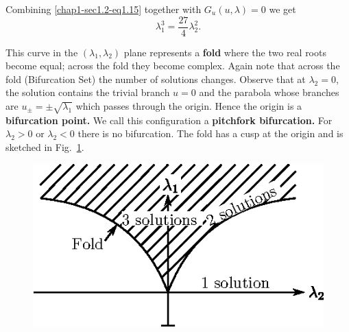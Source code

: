 Combining \eqref{chap1-sec1.2-eq1.15} together with $G_{u}(u, \lambda)
= 0$ we get 
\begin{equation*}
\lambda^{3}_{1} = \frac{27}{4}
\lambda^{2}_{2}.\tag{1.17}\label{chap1-sec1.2-eq1.17} 
\end{equation*}

This curve in the $(\lambda_{1}, \lambda_{2})$ plane represents a \textbf{fold}
where the two real roots become equal; across the fold they become
complex. Again note that across the fold (Bifurcation Set) the number
of solutions changes. Observe that at $\lambda_{2} = 0$, the solution
contains the trivial branch $u = 0$ and the parabola whose branches
are $u_{\pm} = \pm\sqrt{\lambda_{1}}$ which passes through the
origin. Hence the origin is a {\bf{bifurcation point.}} We call this
configuration a {\bf{pitchfork bifurcation.}} For $\lambda_{2} > 0$ or
$\lambda_{2} < 0$ there is no bifurcation. The fold has a cusp at the
origin and is sketched in Fig.~\ref{chap1-sec1.2-fig1.8}.  

\begin{figure}[H]
\centering
\includegraphics{vol79-fig/fig79-8.eps}
\smallskip
\caption{}
\label{chap1-sec1.2-fig1.8}
\end{figure}

